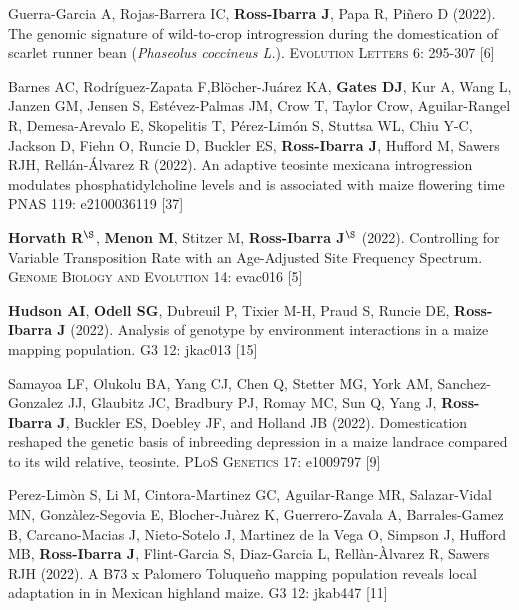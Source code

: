 \documentclass[letterpaper,10pt]{article}
\begin{document}
\begin{etaremune}
\item Guerra-Garcia A, Rojas-Barrera IC, \textbf{Ross-Ibarra J}, Papa R, Pi\~nero D (2022). The genomic signature of wild-to-crop introgression during the domestication of scarlet runner bean (\textit{Phaseolus coccineus L.}). \textsc{Evolution Letters} 6: 295-307 %
 [6]\\

\item Barnes AC, Rodr\'iguez-Zapata F,Bl\"{o}cher-Ju\'arez KA, \textbf{Gates DJ}, Kur A,  Wang L, Janzen GM,  Jensen S, Est\'evez-Palmas JM, Crow T, Taylor Crow, Aguilar-Rangel R, Demesa-Arevalo E, Skopelitis T, P\'erez-Lim\'on S, Stuttsa WL, Chiu Y-C, Jackson D, Fiehn O, Runcie D, Buckler ES, \textbf{Ross-Ibarra J}, Hufford M, Sawers RJH, Rell\'an-\'Alvarez R (2022). An adaptive teosinte mexicana introgression modulates phosphatidylcholine levels and is associated with maize flowering time \textsc{PNAS} 119: e2100036119  %
 [37]\\

\item \textbf{Horvath R}$^\S$, \textbf{Menon M}, Stitzer M, \textbf{Ross-Ibarra J}$^\S$ (2022). Controlling for Variable Transposition Rate with an Age-Adjusted Site Frequency Spectrum. \textsc{Genome Biology and Evolution}  14: evac016 %
 [5]\\

\item \textbf{Hudson AI}, \textbf{Odell SG}, Dubreuil P, Tixier M-H, Praud S, Runcie DE, \textbf{Ross-Ibarra J} (2022).  Analysis of genotype by environment interactions in a maize mapping population. \textsc{G3} 12: jkac013 %
 [15]\\

\item  Samayoa LF, Olukolu  BA, Yang CJ, Chen Q, Stetter MG, York AM, Sanchez-Gonzalez JJ,  Glaubitz JC, Bradbury PJ,  Romay MC, Sun Q, Yang J, \textbf{Ross-Ibarra J}, Buckler ES, Doebley JF, and Holland JB (2022).   Domestication reshaped the genetic basis of inbreeding depression in a maize landrace compared to its wild relative, teosinte. \textsc{PLoS Genetics} 17: e1009797 %
 [9]\\

\item Perez-Lim\`{o}n S, Li M, Cintora-Martinez GC, Aguilar-Range MR, Salazar-Vidal MN, Gonz\`{a}lez-Segovia E, Blocher-Ju\`{a}rez K, Guerrero-Zavala A, Barrales-Gamez B, Carcano-Macias J,  Nieto-Sotelo J, Martinez de la Vega O, Simpson J, Hufford MB, \textbf{Ross-Ibarra J}, Flint-Garcia S, Diaz-Garcia L, Rell\`{a}n-\`{A}lvarez R, Sawers RJH (2022). A B73 x Palomero Toluque\~{n}o mapping population reveals local adaptation in in Mexican highland maize. \textsc{G3} 12: jkab447 %
 [11]\\


\end{etaremune}
\end{document}
